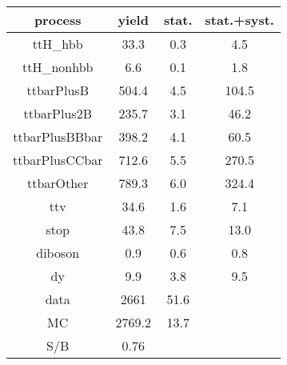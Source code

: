 \begin{tabular}{cccc}
\hline
    process     &  yield  &  stat.  &  stat.+syst.  \\
\hline
    ttH\_hbb     &  33.3   &   0.3   &      4.5      \\
   ttH\_nonhbb   &   6.6   &   0.1   &      1.8      \\
   ttbarPlusB   &  504.4  &   4.5   &     104.5     \\
  ttbarPlus2B   &  235.7  &   3.1   &     46.2      \\
 ttbarPlusBBbar &  398.2  &   4.1   &     60.5      \\
 ttbarPlusCCbar &  712.6  &   5.5   &     270.5     \\
   ttbarOther   &  789.3  &   6.0   &     324.4     \\
      ttv       &  34.6   &   1.6   &      7.1      \\
      stop      &  43.8   &   7.5   &     13.0      \\
    diboson     &   0.9   &   0.6   &      0.8      \\
       dy       &   9.9   &   3.8   &      9.5      \\
      data      &  2661   &  51.6   &               \\
       MC       & 2769.2  &  13.7   &               \\
      S/B       &  0.76   &         &               \\
\hline
\end{tabular}
